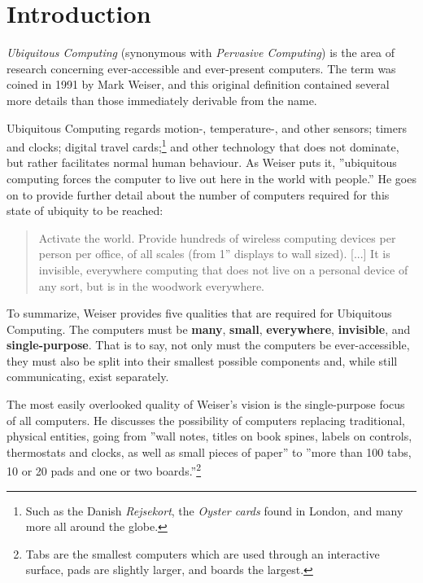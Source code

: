 \section{Introduction}

\emph{Ubiquitous Computing} (synonymous with \emph{Pervasive Computing}) is the area of research concerning
ever-accessible and ever-present computers. The term was coined in 1991 by Mark Weiser, and this original
definition contained several more details than those immediately derivable from the name.

Ubiquitous Computing regards motion-, temperature-, and other sensors; timers and clocks; digital travel
cards;\footnote{Such as the Danish \emph{Rejsekort}, the \emph{Oyster cards} found in London, and many more
all around the globe.} and other technology that does not dominate, but rather facilitates normal human
behaviour. As Weiser puts it, ''ubiquitous computing forces the computer to live out here in the world with
people.''\cite{weiseronline} He goes on to provide further detail about the number of computers required for
this state of ubiquity to be reached:

\begin{quote}
     Activate the world. Provide hundreds of wireless computing devices per person per
     office, of all scales (from 1'' displays to wall sized). [...] It is invisible, everywhere computing that does
     not live on a personal device of any sort, but is in the woodwork everywhere.\cite{weiseronline}
\end{quote}

To summarize, Weiser provides five qualities that are required for Ubiquitous Computing. The computers must be
\textbf{many}, \textbf{small}, \textbf{everywhere}, \textbf{invisible}, and \textbf{single-purpose}. That is to say,
not only must the computers be ever-accessible, they must also be split into their smallest possible components and,
while still communicating, exist separately.

The most easily overlooked quality of Weiser's vision is the single-purpose focus of all computers. He discusses
the possibility of computers replacing traditional, physical entities, going from ''wall notes, titles on book spines,
labels on controls, thermostats and clocks, as well as small pieces of paper'' to ''more than 100 tabs, 10 or 20 pads
and one or two boards.''\footnote{Tabs are the smallest computers which are used through an interactive surface, pads
are slightly larger, and boards the largest.}\cite{weiser91}

